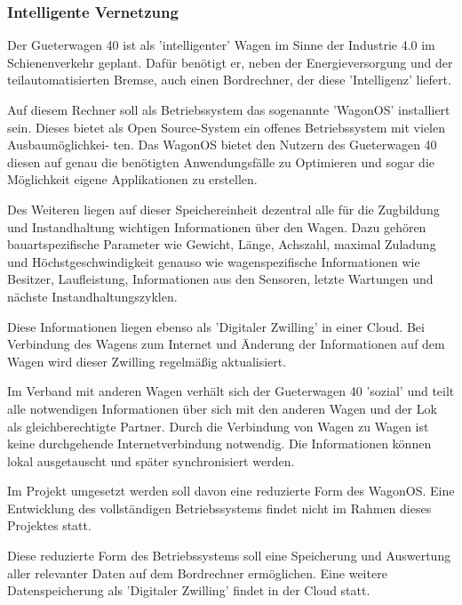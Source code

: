 \subsubsection{Intelligente Vernetzung}
Der \gls{Gueterwagen 40} ist als 'intelligenter' Wagen im Sinne der Industrie 4.0 im Schienenverkehr geplant. Dafür benötigt er, neben der Energieversorgung und der teilautomatisierten Bremse, auch einen Bordrechner, der diese 'Intelligenz' liefert.\par
Auf diesem Rechner soll als Betriebssystem das sogenannte 'WagonOS' installiert sein. Dieses bietet als Open Source-System ein offenes Betriebssystem mit vielen Ausbaumöglichkei- ten. Das WagonOS bietet den Nutzern des \gls{Gueterwagen 40}  diesen auf genau die benötigten Anwendungsfälle zu Optimieren und sogar die Möglichkeit eigene Applikationen zu erstellen.\par
Des Weiteren liegen auf dieser Speichereinheit dezentral alle für die Zugbildung und Instandhaltung wichtigen Informationen über den Wagen. Dazu gehören bauartspezifische Parameter wie Gewicht, Länge, Achszahl, maximal Zuladung und Höchstgeschwindigkeit genauso wie wagenspezifische Informationen wie Besitzer, Laufleistung, Informationen aus den Sensoren, letzte Wartungen und nächste Instandhaltungszyklen.\par
Diese Informationen liegen ebenso als 'Digitaler Zwilling' in einer Cloud. Bei Verbindung des Wagens zum Internet und Änderung der Informationen auf dem Wagen wird dieser Zwilling regelmäßig aktualisiert.\par
Im Verband mit anderen Wagen verhält sich der \gls{Gueterwagen 40} 'sozial' und teilt alle notwendigen Informationen über sich mit den anderen Wagen und der Lok als gleichberechtigte Partner. Durch die Verbindung von Wagen zu Wagen ist keine durchgehende Internetverbindung notwendig. Die Informationen können lokal ausgetauscht und später synchronisiert werden.\par
Im Projekt umgesetzt werden soll davon eine reduzierte Form des WagonOS. Eine Entwicklung des vollständigen Betriebssystems findet nicht im Rahmen dieses Projektes statt.\par
Diese reduzierte Form des Betriebssystems soll eine Speicherung und Auswertung aller relevanter Daten auf dem Bordrechner ermöglichen. Eine weitere Datenspeicherung als 'Digitaler Zwilling' findet in der Cloud statt.

